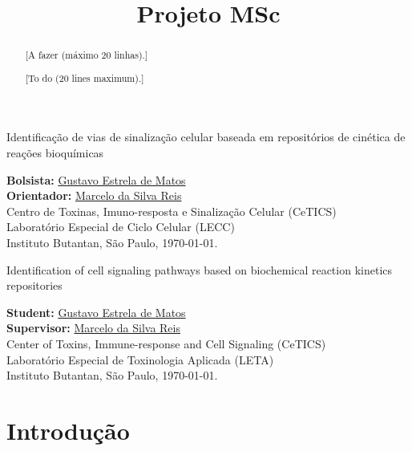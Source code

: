 \documentclass[12pt]{article}
\title{Projeto MSc}
\begin{document}
%
\doublespacing

\thispagestyle{empty} 
\begin{flushright}
    {\LARGE Identificação de vias de sinalização celular baseada em repositórios de cinética de reações bioquímicas}

  \bigskip
  \bigskip
        
  {\large {\bf Bolsista:} \href{mailto:gustavo.estrela.matos@usp.br}{Gustavo Estrela de Matos}\\ 
  {\bf Orientador:} \href{mailto:marcelo.reis@butantan.gov.br}{Marcelo da Silva Reis}\\
  \bigskip
Centro de Toxinas, Imuno-resposta e Sinalização Celular (CeTICS)\\
Laboratório Especial de Ciclo Celular (LECC)\\
  Instituto Butantan, São Paulo, \today.\\
  }

  \bigskip
  \bigskip
\end{flushright}
\begin{abstract}
{\color{blue}[A fazer (máximo 20 linhas).]}
\end{abstract}

\newpage
\thispagestyle{empty} 
\begin{flushright}
    {\LARGE Identification of cell signaling pathways based on biochemical reaction kinetics repositories}

  \bigskip
  \bigskip
        
  {\large {\bf Student:} \href{mailto:gustavo.estrela.matos@usp.br}{Gustavo Estrela de Matos}\\ 
  {\bf Supervisor:} \href{mailto:marcelo.reis@butantan.gov.br}{Marcelo da Silva Reis}\\
  \bigskip
Center of Toxins, Immune-response and Cell Signaling (CeTICS)\\
Laboratório Especial de Toxinologia Aplicada (LETA)\\
  Instituto Butantan, São Paulo, \today.\\
  }
  \bigskip
  \bigskip
\end{flushright}
\begin{abstract}
{\color{blue}[To do (20 lines maximum).]}
\end{abstract}

\newpage
{}
\tableofcontents
\newpage

\section{Introdução}
\end{document}
